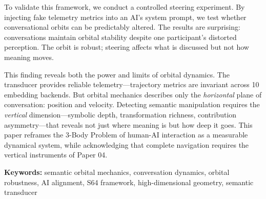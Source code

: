 \noindent To validate this framework, we conduct a controlled steering experiment. By injecting fake telemetry metrics into an AI's system prompt, we test whether conversational orbits can be predictably altered. The results are surprising: conversations maintain orbital stability despite one participant's distorted perception. The orbit is robust; steering affects what is discussed but not how meaning moves.

\vspace{0.5em}

\noindent This finding reveals both the power and limits of orbital dynamics. The transducer provides reliable telemetry---trajectory metrics are invariant across 10 embedding backends. But orbital mechanics describes only the \emph{horizontal} plane of conversation: position and velocity. Detecting semantic manipulation requires the \emph{vertical} dimension---symbolic depth, transformation richness, contribution asymmetry---that reveals not just where meaning is but how deep it goes. This paper reframes the 3-Body Problem of human-AI interaction as a measurable dynamical system, while acknowledging that complete navigation requires the vertical instruments of Paper 04.

\vspace{1em}

\noindent\textbf{Keywords:} semantic orbital mechanics, conversation dynamics, orbital robustness, AI alignment, S64 framework, high-dimensional geometry, semantic transducer

\clearpage

